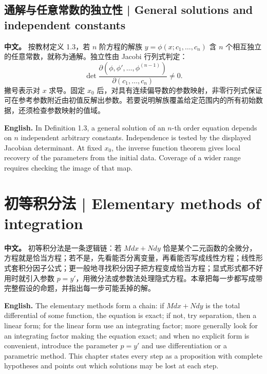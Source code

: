 \documentclass[UTF8,11pt,a4paper]{ctexart}
\newcommand{\APS}[2]{\par\noindent\textbf{中文。} #1\par\noindent\textbf{English.} #2\par}
\begin{document}
\subsection{通解与任意常数的独立性 | General solutions and independent constants}
\APS{按教材定义 1.3，若 $n$ 阶方程的解族 $y=\phi(x;c_1,\ldots,c_n)$ 含 $n$ 个相互独立的任意常数，就称为通解。独立性由 Jacobi 行列式判定：
\[
\det\frac{\partial(\phi,\phi',\ldots,\phi^{(n-1)})}
{\partial(c_1,\ldots,c_n)}\ne0.
\]
撇号表示对 $x$ 求导。固定 $x_0$ 后，对具有连续偏导数的参数映射，非零行列式保证可在参考参数附近由初值反解出参数。若要说明解族覆盖给定范围内的所有初始数据，还须检查参数映射的值域。}{In Definition 1.3, a general solution of an $n$-th order equation depends on $n$ independent arbitrary constants. Independence is tested by the displayed Jacobian determinant. At fixed $x_0$, the inverse function theorem gives local recovery of the parameters from the initial data. Coverage of a wider range requires checking the image of that map.}

\section[初等积分法]{初等积分法 | Elementary methods of integration}
\APS{初等积分法是一条逻辑链：若 $Mdx+Ndy$ 恰是某个二元函数的全微分，方程就是恰当方程；若不是，先看能否分离变量，再看能否写成线性方程；线性形式套积分因子公式；更一般地寻找积分因子把方程变成恰当方程；显式形式都不好用时就引入参数 $p=y'$，用微分法或参数法处理隐式方程。本章把每一步都写成带完整假设的命题，并指出每一步可能丢掉的解。}{The elementary methods form a chain: if $Mdx+Ndy$ is the total differential of some function, the equation is exact; if not, try separation, then a linear form; for the linear form use an integrating factor; more generally look for an integrating factor making the equation exact; and when no explicit form is convenient, introduce the parameter $p=y'$ and use differentiation or a parametric method. This chapter states every step as a proposition with complete hypotheses and points out which solutions may be lost at each step.}
\end{document}
